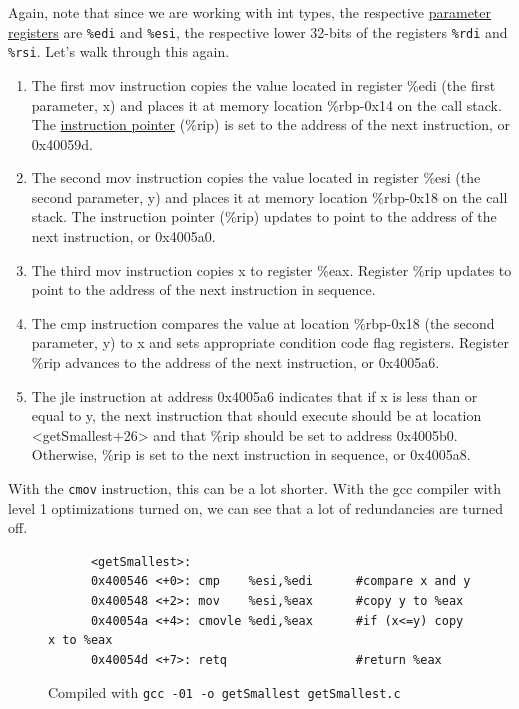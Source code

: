   Again, note that since we are working with int types, the respective \hyperref[def:parameter-registers]{parameter registers} are \texttt{\%edi} and \texttt{\%esi}, the respective lower 32-bits of the registers \texttt{\%rdi} and \texttt{\%rsi}. Let's walk through this again. 
  \begin{enumerate}
    \item The first mov instruction copies the value located in register \%edi (the first parameter, x) and places it at memory location \%rbp-0x14 on the call stack. The \hyperref[def:instruction-pointer]{instruction pointer} (\%rip) is set to the address of the next instruction, or 0x40059d.
    \item The second mov instruction copies the value located in register \%esi (the second parameter, y) and places it at memory location \%rbp-0x18 on the call stack. The instruction pointer (\%rip) updates to point to the address of the next instruction, or 0x4005a0.
    \item The third mov instruction copies x to register \%eax. Register \%rip updates to point to the address of the next instruction in sequence.
    \item The cmp instruction compares the value at location \%rbp-0x18 (the second parameter, y) to x and sets appropriate condition code flag registers. Register \%rip advances to the address of the next instruction, or 0x4005a6.
    \item The jle instruction at address 0x4005a6 indicates that if x is less than or equal to y, the next instruction that should execute should be at location <getSmallest+26> and that \%rip should be set to address 0x4005b0. Otherwise, \%rip is set to the next instruction in sequence, or 0x4005a8.
  \end{enumerate}

  With the \texttt{cmov} instruction, this can be a lot shorter. With the gcc compiler with level 1 optimizations turned on, we can see that a lot of redundancies are turned off. 

  \begin{figure}[H]
    \centering 
    \begin{lstlisting}
      <getSmallest>:
      0x400546 <+0>: cmp    %esi,%edi      #compare x and y
      0x400548 <+2>: mov    %esi,%eax      #copy y to %eax
      0x40054a <+4>: cmovle %edi,%eax      #if (x<=y) copy x to %eax
      0x40054d <+7>: retq                  #return %eax
    \end{lstlisting}
    \caption{Compiled with \texttt{gcc -01 -o getSmallest getSmallest.c} } 
    \label{fig:if_statement_optimized}
  \end{figure}

